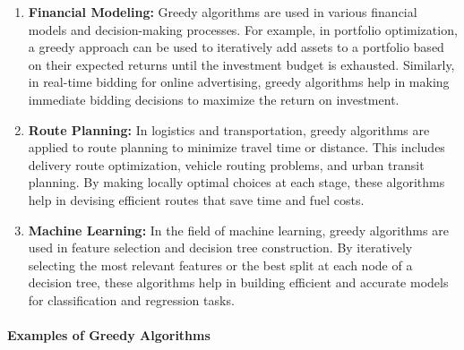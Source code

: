 \documentclass[
]{article}
\begin{document}
\begin{enumerate}
        \item \textbf{Financial Modeling:} Greedy algorithms are used in various financial models and decision-making processes. For example, in portfolio optimization, a greedy approach can be used to iteratively add assets to a portfolio based on their expected returns until the investment budget is exhausted. Similarly, in real-time bidding for online advertising, greedy algorithms help in making immediate bidding decisions to maximize the return on investment.

        \item \textbf{Route Planning:} In logistics and transportation, greedy algorithms are applied to route planning to minimize travel time or distance. This includes delivery route optimization, vehicle routing problems, and urban transit planning. By making locally optimal choices at each stage, these algorithms help in devising efficient routes that save time and fuel costs.

        \item \textbf{Machine Learning:} In the field of machine learning, greedy algorithms are used in feature selection and decision tree construction. By iteratively selecting the most relevant features or the best split at each node of a decision tree, these algorithms help in building efficient and accurate models for classification and regression tasks.

    \end{enumerate}

    \paragraph{Examples of Greedy Algorithms}
\end{document}
